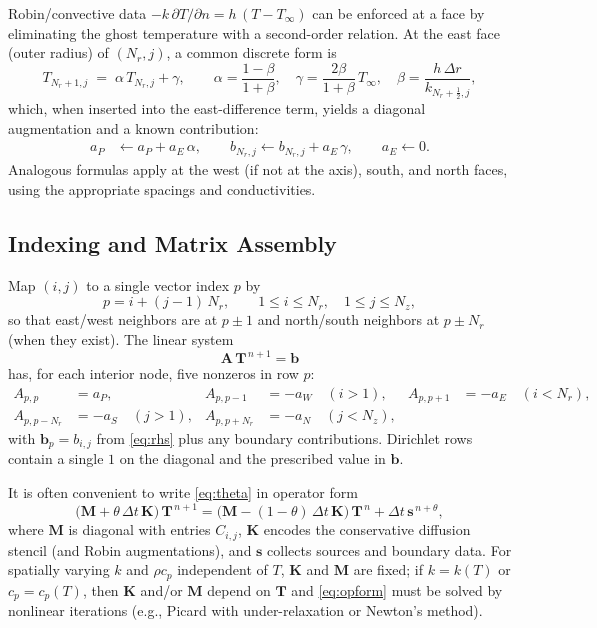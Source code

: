 \documentclass[11pt]{article}
\begin{document}
Robin/convective data $-k\,\partial T/\partial n = h\,(T-T_\infty)$ can be enforced at a face by eliminating the ghost temperature with a second-order relation. At the east face (outer radius) of $(N_r,j)$, a common discrete form is
\begin{equation}
T_{N_r+1,j} \;=\; \alpha\,T_{N_r,j} + \gamma,
\qquad
\alpha=\frac{1-\beta}{1+\beta},\quad
\gamma=\frac{2\beta}{1+\beta}\,T_\infty,\quad
\beta=\frac{h\,\Delta r}{k_{N_r+\frac{1}{2},j}},
\label{eq:robinElim}
\end{equation}
which, when inserted into the east-difference term, yields a diagonal augmentation and a known contribution:
\begin{align}
a_P &\leftarrow a_P + a_E\,\alpha,\qquad
b_{N_r,j} \leftarrow b_{N_r,j} + a_E\,\gamma,\qquad
a_E \leftarrow 0.
\end{align}
Analogous formulas apply at the west (if not at the axis), south, and north faces, using the appropriate spacings and conductivities.

\subsection{Indexing and Matrix Assembly}

Map $(i,j)$ to a single vector index $p$ by
\begin{equation}
p = i + (j-1)\,N_r,\qquad
1\le i\le N_r,\quad 1\le j\le N_z,
\label{eq:map}
\end{equation}
so that east/west neighbors are at $p\pm 1$ and north/south neighbors at $p\pm N_r$ (when they exist). The linear system
\begin{equation}
\mathbf{A}\, \mathbf{T}^{\,n+1} = \mathbf{b}
\label{eq:linsys}
\end{equation}
has, for each interior node, five nonzeros in row $p$:
\begin{align}
A_{p,p} &= a_P,&
A_{p,p-1} &= -a_W \quad (i>1),&
A_{p,p+1} &= -a_E \quad (i<N_r),\nonumber\\
A_{p,p-N_r} &= -a_S \quad (j>1),&
A_{p,p+N_r} &= -a_N \quad (j<N_z),
\end{align}
with $\mathbf{b}_p=b_{i,j}$ from \eqref{eq:rhs} plus any boundary contributions. Dirichlet rows contain a single $1$ on the diagonal and the prescribed value in $\mathbf{b}$.

It is often convenient to write \eqref{eq:theta} in operator form
\begin{equation}
\big(\mathbf{M} + \theta\,\Delta t\,\mathbf{K}\big)\,\mathbf{T}^{\,n+1}
= \big(\mathbf{M} - (1-\theta)\,\Delta t\,\mathbf{K}\big)\,\mathbf{T}^{\,n}
+ \Delta t\,\mathbf{s}^{\,n+\theta},
\label{eq:opform}
\end{equation}
where $\mathbf{M}$ is diagonal with entries $C_{i,j}$, $\mathbf{K}$ encodes the conservative diffusion stencil (and Robin augmentations), and $\mathbf{s}$ collects sources and boundary data. For spatially varying $k$ and $\rho c_p$ independent of $T$, $\mathbf{K}$ and $\mathbf{M}$ are fixed; if $k=k(T)$ or $c_p=c_p(T)$, then $\mathbf{K}$ and/or $\mathbf{M}$ depend on $\mathbf{T}$ and \eqref{eq:opform} must be solved by nonlinear iterations (e.g., Picard with under-relaxation or Newton's method).
\end{document}
